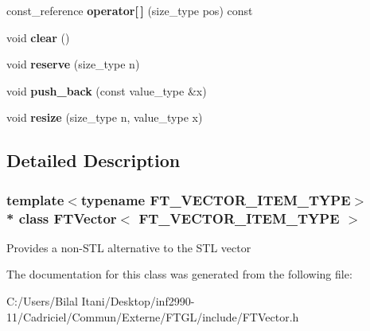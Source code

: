 \begin{DoxyCompactItemize}
\item 
const\+\_\+reference {\bfseries operator\mbox{[}$\,$\mbox{]}} (size\+\_\+type pos) const \hypertarget{class_f_t_vector_a3da21c8d8b89ab5f0ad2d4db5fef89c5}{}\label{class_f_t_vector_a3da21c8d8b89ab5f0ad2d4db5fef89c5}

\item 
void {\bfseries clear} ()\hypertarget{class_f_t_vector_a67f25dc63f17ffa9d7cc12c11175e900}{}\label{class_f_t_vector_a67f25dc63f17ffa9d7cc12c11175e900}

\item 
void {\bfseries reserve} (size\+\_\+type n)\hypertarget{class_f_t_vector_a148e3c1116a60d9c3edd787936e0df27}{}\label{class_f_t_vector_a148e3c1116a60d9c3edd787936e0df27}

\item 
void {\bfseries push\+\_\+back} (const value\+\_\+type \&x)\hypertarget{class_f_t_vector_a791d950e681867166b7afaca20c72722}{}\label{class_f_t_vector_a791d950e681867166b7afaca20c72722}

\item 
void {\bfseries resize} (size\+\_\+type n, value\+\_\+type x)\hypertarget{class_f_t_vector_a44869ccb17027d3880c5b5054c325dba}{}\label{class_f_t_vector_a44869ccb17027d3880c5b5054c325dba}

\end{DoxyCompactItemize}


\subsection{Detailed Description}
\subsubsection*{template$<$typename F\+T\+\_\+\+V\+E\+C\+T\+O\+R\+\_\+\+I\+T\+E\+M\+\_\+\+T\+Y\+PE$>$\\*
class F\+T\+Vector$<$ F\+T\+\_\+\+V\+E\+C\+T\+O\+R\+\_\+\+I\+T\+E\+M\+\_\+\+T\+Y\+P\+E $>$}

Provides a non-\/\+S\+TL alternative to the S\+TL vector 

The documentation for this class was generated from the following file\+:\begin{DoxyCompactItemize}
\item 
C\+:/\+Users/\+Bilal Itani/\+Desktop/inf2990-\/11/\+Cadriciel/\+Commun/\+Externe/\+F\+T\+G\+L/include/F\+T\+Vector.\+h\end{DoxyCompactItemize}
